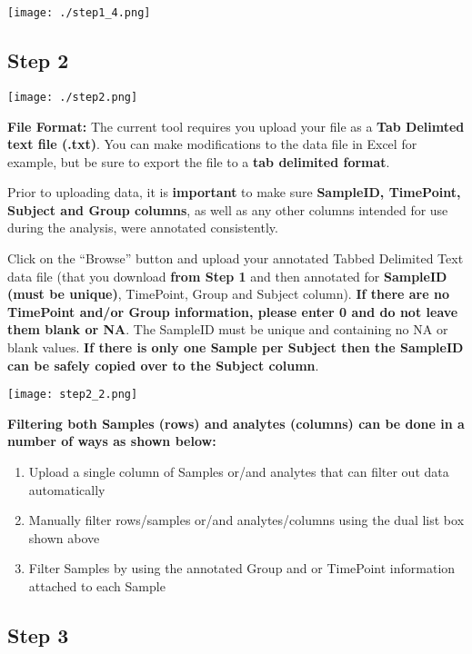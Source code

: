 \documentclass[]{article}
\providecommand{\tightlist}{%
  \setlength{\itemsep}{0pt}\setlength{\parskip}{0pt}}
\begin{document}
\texttt{[image: ./step1\_4.png]}

\newpage

\hypertarget{step-2}{%
\subsection{Step 2}\label{step-2}}

\texttt{[image: ./step2.png]}

 \textbf{File Format:} The current tool requires you upload your file as
a \textbf{Tab Delimted text file (.txt)}. You can make modifications to
the data file in Excel for example, but be sure to export the file to a
\textbf{tab delimited format}.

Prior to uploading data, it is \textbf{important} to make sure
\textbf{SampleID, TimePoint, Subject and Group columns}, as well as any
other columns intended for use during the analysis, were annotated
consistently.

Click on the ``Browse'' button and upload your annotated Tabbed
Delimited Text data file (that you download \textbf{from Step 1} and
then annotated for \textbf{SampleID (must be unique)}, TimePoint, Group
and Subject column). \textbf{If there are no TimePoint and/or Group
information, please enter 0 and do not leave them blank or NA}. The
SampleID must be unique and containing no NA or blank values. \textbf{If
there is only one Sample per Subject then the SampleID can be safely
copied over to the Subject column}.

\texttt{[image: step2\_2.png]}

\textbf{Filtering both Samples (rows) and analytes (columns) can be done
in a number of ways as shown below:}

\begin{enumerate}
\def\labelenumi{\arabic{enumi}.}
\tightlist
\item
  Upload a single column of Samples or/and analytes that can filter out
  data automatically
\item
  Manually filter rows/samples or/and analytes/columns using the dual
  list box shown above
\item
  Filter Samples by using the annotated Group and or TimePoint
  information attached to each Sample
\end{enumerate}

\newpage

\hypertarget{step-3}{%
\subsection{Step 3}\label{step-3}}
\end{document}
